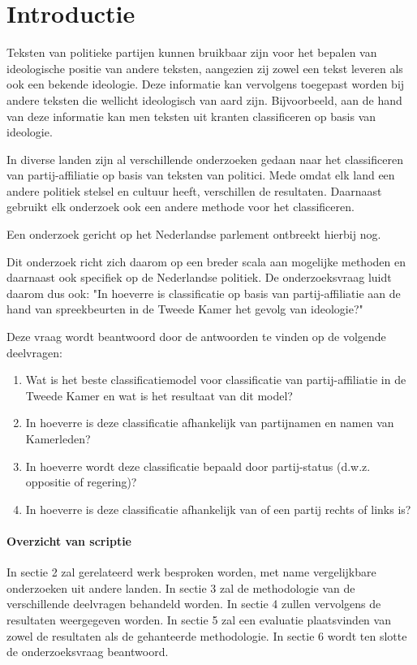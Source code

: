 \section{Introductie}
\label{sec:intro}
Teksten van politieke partijen kunnen bruikbaar zijn voor het bepalen van ideologische positie van andere teksten, aangezien zij zowel een tekst leveren als ook een bekende ideologie. Deze informatie kan vervolgens toegepast worden bij andere teksten die wellicht ideologisch van aard zijn. Bijvoorbeeld, aan de hand van deze informatie kan men teksten uit kranten classificeren op basis van ideologie\cite{DBLP:journals/corr/Biessmann16,Hirst_textto}.\par
In diverse landen zijn al verschillende onderzoeken gedaan naar het classificeren van partij-affiliatie op basis van teksten van politici\cite{Ferreira2016UsingTT,DBLP:journals/corr/Biessmann16}. Mede omdat elk land een andere politiek stelsel en cultuur heeft, verschillen de resultaten. Daarnaast gebruikt elk onderzoek ook een andere methode voor het classificeren. \par
Een onderzoek gericht op het Nederlandse parlement ontbreekt hierbij nog. \par
Dit onderzoek richt zich daarom op een breder scala aan mogelijke methoden en daarnaast ook specifiek op de Nederlandse politiek. De onderzoeksvraag luidt daarom dus ook: "In hoeverre is classificatie op basis van partij-affiliatie aan de hand van spreekbeurten in de Tweede Kamer het gevolg van ideologie?"\par
Deze vraag wordt beantwoord door de antwoorden te vinden op de volgende deelvragen:
\begin{enumerate}
    \item Wat is het beste classificatiemodel voor classificatie van partij-affiliatie in de Tweede Kamer en wat is het resultaat van dit model?
    \item In hoeverre is deze classificatie afhankelijk van partijnamen en namen van Kamerleden?
    \item In hoeverre wordt deze classificatie bepaald door partij-status (d.w.z. oppositie of regering)?
    \item In hoeverre is deze classificatie afhankelijk van of een partij rechts of links is?
\end{enumerate}


\paragraph{Overzicht van scriptie}
In sectie 2 zal gerelateerd werk besproken worden, met name vergelijkbare onderzoeken uit andere landen. In sectie 3 zal de methodologie van de verschillende deelvragen behandeld worden. In sectie 4 zullen vervolgens de resultaten weergegeven worden. In sectie 5 zal een evaluatie plaatsvinden van zowel de resultaten als de gehanteerde methodologie. In sectie 6 wordt ten slotte de onderzoeksvraag beantwoord.
